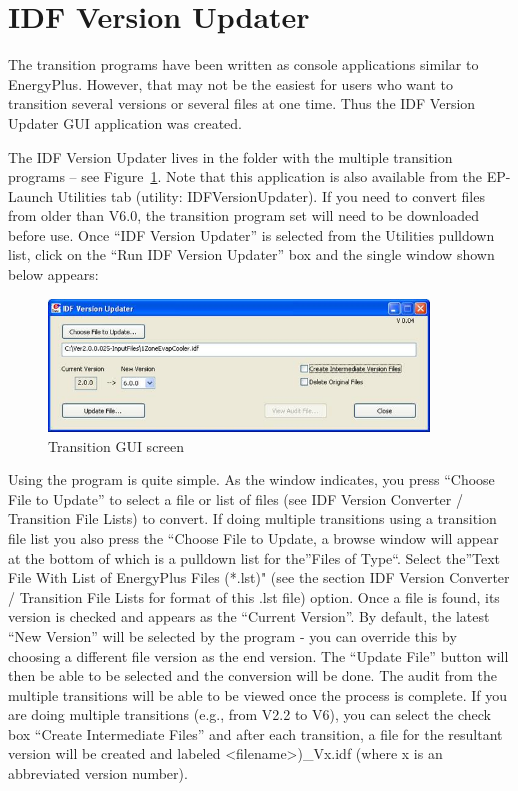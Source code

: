 \section{IDF Version Updater}\label{idf-version-updater}

The transition programs have been written as console applications similar to EnergyPlus. However, that may not be the easiest for users who want to transition several versions or several files at one time. Thus the IDF Version Updater GUI application was created.

The IDF Version Updater lives in the folder with the multiple transition programs -- see Figure~\ref{fig:transition-gui-screen}. Note that this application is also available from the EP-Launch Utilities tab (utility: IDFVersionUpdater). If you need to convert files from older than V6.0, the transition program set will need to be downloaded before use. Once ``IDF Version Updater'' is selected from the Utilities pulldown list, click on the ``Run IDF Version Updater'' box and the single window shown below appears:

\begin{figure}[hbtp] %
\centering
\includegraphics[width=0.9\textwidth, height=0.9\textheight, keepaspectratio=true]{media/image027.jpg}
\caption{Transition GUI screen \protect \label{fig:transition-gui-screen}}
\end{figure}

Using the program is quite simple. As the window indicates, you press ``Choose File to Update'' to select a file or list of files (see IDF Version Converter / Transition File Lists) to convert. If doing multiple transitions using a transition file list you also press the ``Choose File to Update, a browse window will appear at the bottom of which is a pulldown list for the''Files of Type``. Select the''Text File With List of EnergyPlus Files (*.lst)" (see the section IDF Version Converter / Transition File Lists for format of this .lst file) option. Once a file is found, its version is checked and appears as the ``Current Version''. By default, the latest ``New Version'' will be selected by the program - you can override this by choosing a different file version as the end version. The ``Update File'' button will then be able to be selected and the conversion will be done. The audit from the multiple transitions will be able to be viewed once the process is complete. If you are doing multiple transitions (e.g., from V2.2 to V6), you can select the check box ``Create Intermediate Files'' and after each transition, a file for the resultant version will be created and labeled \textless{}filename\textgreater{})\_Vx.idf (where x is an abbreviated version number).

